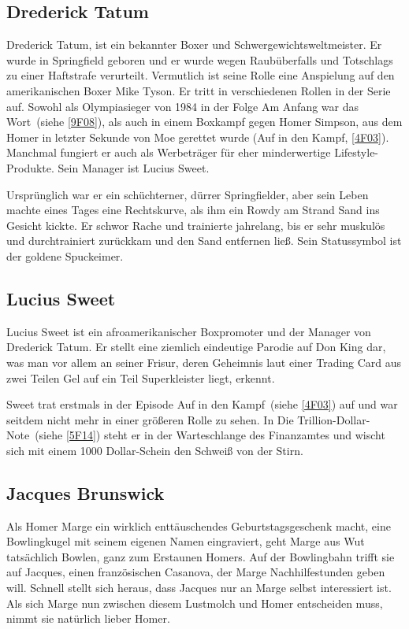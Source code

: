 {\subsection{Drederick Tatum}\label{Tatum}
Drederick Tatum, ist ein bekannter Boxer und Schwergewichtsweltmeister. Er wurde in Springfield geboren und er wurde wegen Raubüberfalls und Totschlags zu einer Haftstrafe verurteilt. Vermutlich ist seine Rolle eine Anspielung auf den amerikanischen Boxer Mike Tyson. Er tritt in verschiedenen Rollen in der Serie auf. Sowohl als Olympiasieger von 1984 in der Folge \glqq Am Anfang war das Wort\grqq\ (siehe \ref{9F08}), als auch in einem Boxkampf gegen Homer Simpson, aus dem Homer in letzter Sekunde von Moe gerettet wurde (\glqq Auf in den Kampf\grqq , \ref{4F03}). Manchmal fungiert er auch als Werbeträger für eher minderwertige Lifestyle-Produkte. Sein Manager ist Lucius Sweet.

Ursprünglich war er ein schüchterner, dürrer Springfielder, aber sein Leben machte eines Tages eine Rechtskurve, als ihm ein Rowdy am Strand Sand ins Gesicht kickte. Er schwor Rache und trainierte jahrelang, bis er sehr muskulös und durchtrainiert zurückkam und den Sand entfernen ließ. Sein Statussymbol ist der goldene Spuckeimer.

\subsection{Lucius Sweet}
Lucius Sweet ist ein afroamerikanischer Boxpromoter und der Manager von Drederick Tatum. Er stellt eine ziemlich eindeutige Parodie auf Don King dar, was man vor allem an seiner Frisur, deren Geheimnis laut einer Trading Card aus zwei Teilen Gel auf ein Teil Superkleister liegt, erkennt.

Sweet trat erstmals in der Episode \glqq Auf in den Kampf\grqq\ (siehe \ref{4F03}) auf und war seitdem nicht mehr in einer größeren Rolle zu sehen. In \glqq Die Trillion-Dollar-Note\grqq\ (siehe \ref{5F14}) steht er in der Warteschlange des Finanzamtes und wischt sich mit einem 1000 Dollar-Schein den Schweiß von der Stirn.


\subsection{Jacques Brunswick}
Als Homer Marge ein wirklich enttäuschendes Geburtstagsgeschenk macht, eine Bowlingkugel mit seinem eigenen Namen eingraviert, geht Marge aus Wut tatsächlich Bowlen, ganz zum Erstaunen Homers. Auf der Bowlingbahn trifft sie auf Jacques, einen französischen Casanova, der Marge Nachhilfestunden geben will. Schnell stellt sich heraus, dass Jacques nur an Marge selbst interessiert ist. Als sich Marge nun zwischen diesem Lustmolch und Homer entscheiden muss, nimmt sie natürlich lieber Homer.

}
